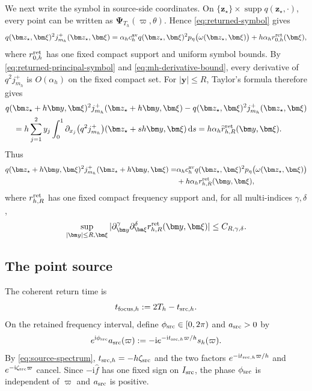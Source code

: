 \documentclass[11pt,reqno]{amsart}
\newcommand{\ii}{\mathrm{i}}
\newcommand{\dd}{\,\mathrm{d}}
\newcommand{\supp}{\operatorname{supp}}
\numberwithin{equation}{section}
\begin{document}
We next write the symbol in source-side coordinates. On $\{\bm z_\star\}\times\supp q(\bm z_\star,\cdot)$, every point can be written as $\bm\Psi_{T_h}(\varpi,\theta)$. Hence \eqref{eq:returned-symbol} gives
\begin{equation*}
 q(\bm z_\star,\bm\xi)^2j_{m_h}^+(\bm z_\star,\bm\xi)=\alpha_hc_h^{\rm av}q(\bm z_\star,\bm\xi)^2p_\eta\bigl(\omega(\bm z_\star,\bm\xi)\bigr)+h\alpha_h r_{0,h}^{\rm ret}(\bm\xi),
\end{equation*}
where $r_{0,h}^{\rm ret}$ has one fixed compact support and uniform symbol bounds. By \eqref{eq:returned-principal-symbol} and \eqref{eq:mh-derivative-bound}, every derivative of $q^2j_{m_h}^+$ is $O(\alpha_h)$ on the fixed compact set. For $|\bm y|\le R$, Taylor's formula therefore gives
\begin{equation*}
 \begin{aligned}
 &q(\bm z_\star+h\bm y,\bm\xi)^2j_{m_h}^+(\bm z_\star+h\bm y,\bm\xi)-q(\bm z_\star,\bm\xi)^2j_{m_h}^+(\bm z_\star,\bm\xi)\\
 &\quad=h\sum_{j=1}^2y_j\int_0^1\partial_{x_j}\bigl(q^2j_{m_h}^+\bigr)(\bm z_\star+sh\bm y,\bm\xi)\dd s
 =h\alpha_h\widetilde r_{h,R}^{\rm ret}(\bm y,\bm\xi).
 \end{aligned}
\end{equation*}
Thus
\begin{equation}\label{eq:selected-returned-frozen}
 \begin{aligned}
 q(\bm z_\star+h\bm y,\bm\xi)^2j_{m_h}^+(\bm z_\star+h\bm y,\bm\xi)=&\alpha_hc_h^{\rm av}q(\bm z_\star,\bm\xi)^2p_\eta\bigl(\omega(\bm z_\star,\bm\xi)\bigr)\\
 &+h\alpha_h r_{h,R}^{\rm ret}(\bm y,\bm\xi),
 \end{aligned}
\end{equation}
where $r_{h,R}^{\rm ret}$ has one fixed compact frequency support and, for all multi-indices $\gamma,\delta$,
\begin{equation*}
 \sup_{|\bm y|\le R,\bm\xi}|\partial_{\bm y}^{\gamma}\partial_{\bm\xi}^{\delta}
 r_{h,R}^{\rm ret}(\bm y,\bm\xi)|\le C_{R,\gamma,\delta}.
\end{equation*}

\subsection{The point source}

The coherent return time is
\begin{equation*}
 t_{{\rm focus},h}:=2T_h-t_{{\rm src},h}.
\end{equation*}
On the retained frequency interval, define $\phi_{\rm src}\in[0,2\pi)$ and $a_{\rm src}>0$ by
\begin{equation*}
 e^{\ii\phi_{\rm src}}a_{\rm src}(\varpi):=-\ii e^{-\ii t_{{\rm src},h}\varpi/h}s_h(\varpi).
\end{equation*}
By \eqref{eq:source-spectrum}, $t_{{\rm src},h}=-h\zeta_{\rm src}$ and the two factors $e^{-\ii t_{{\rm src},h}\varpi/h}$ and $e^{-\ii\zeta_{\rm src}\varpi}$ cancel. Since $-\ii\widehat f$ has one fixed sign on $I_{\rm src}$, the phase $\phi_{\rm src}$ is independent of $\varpi$ and $a_{\rm src}$ is positive.
\end{document}
